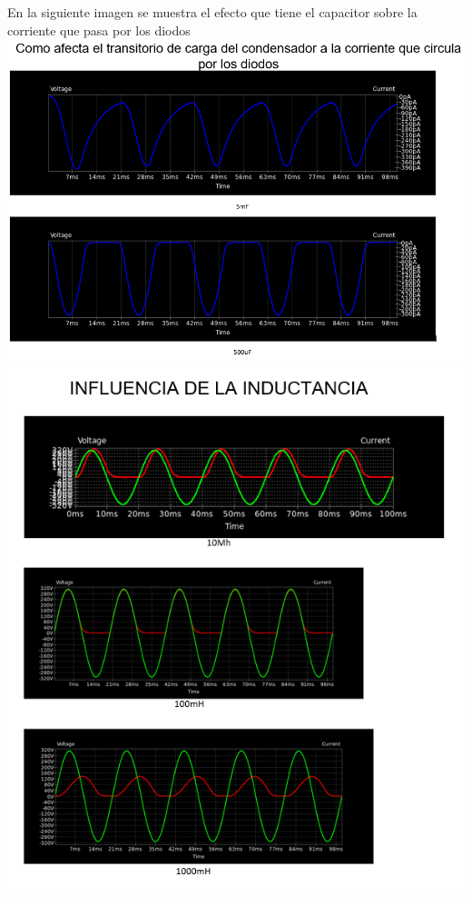 \documentclass[12pt,a4paper]{article}
\begin{document}
\begin{center}
En la siguiente imagen se muestra el efecto que tiene el capacitor sobre la corriente que pasa por los diodos\\
\includegraphics[scale=0.8]{imagenes/p2/dio3/diofinal.PNG} 
\\
\includegraphics[scale=0.7]{imagenes/p2/inductor/induto.PNG} 
\\

\end{center}
\end{document}

